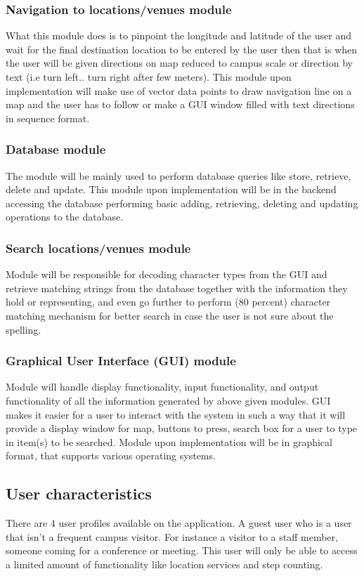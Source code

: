 \documentclass[11pt]{article}
\begin{document}
			\subsubsection{Navigation to locations/venues module}
			What this module does is to pinpoint the longitude and latitude of the user and wait for the final destination location to be entered by the user then that is when the user will be given directions on map reduced to campus scale or direction by text (i.e turn left.. turn right after few meters). This module upon implementation will make use of vector data points to draw navigation line on a map and the user has to follow or make a GUI window filled with text directions in sequence format.
			\subsubsection{Database module}
			The module will be mainly used to perform database queries like store, retrieve, delete and update. This module upon implementation will be in the backend accessing the database performing basic adding, retrieving, deleting and updating operations to the database.
			\subsubsection{Search locations/venues module}
			Module will be responsible for decoding character types from the GUI and retrieve matching strings from the database together with the information they hold or representing, and even go further to perform (80 percent) character matching mechanism for better search in case the user is not sure about the spelling.
			\subsubsection{Graphical User Interface (GUI) module}
			Module will handle display functionality, input functionality, and output functionality of all the information generated by above given modules. GUI makes it easier for a user to interact with the system in such a way that it will provide a display window for map, buttons to press, search box for a user to type in item(s) to be searched. Module upon implementation will be in graphical format, that supports various operating systems.
			
      \subsection{User characteristics}
      There are 4 user profiles available on the application. A guest user who is a user that isn’t a frequent campus visitor. 		 For instance a visitor to a staff member, someone coming for a conference or meeting. This user will only be able to 			access a limited amount of functionality like location services and step counting.  
\end{document}
